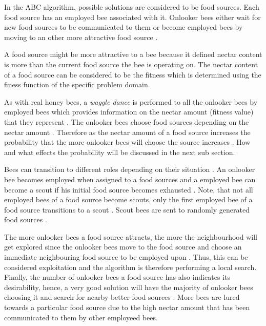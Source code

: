 In the ABC algorithm, possible solutions are considered to be food sources\cite{ABCCompareStudy,ABCNumericalOptimization}. Each food source has an employed bee associated with it. Onlooker bees either wait for new food sources to be communicated to them or become employed bees by moving to an other more attractive food source \cite{ABCCompareStudy,ABCNumericalOptimization}. 

A food source might be more attractive to a bee because it defined nectar content is more than the current food source the bee is operating on\cite{ABCCompareStudy,ABCNumericalOptimization}. The nectar content of a food source can be considered to be the fitness which is determined using the finess function of the specific problem domain\cite{ABCCompareStudy,ABCNumericalOptimization}.

As with real honey bees, a \emph{waggle dance} is performed to all the onlooker bees by employed bees which provides information on the nectar amount (fitness value) that they represent \cite{ABCReconfigDistro,ABCCompareStudy,ABCImageEnhancement}. The onlooker bees choose food sources depending on the nectar amount \cite{ABCReconfigDistro,ABCCompareStudy,ABCImageEnhancement}. Therefore as the nectar amount of a food source increases the probability that the more onlooker bees will choose the source increases \cite{ABCReconfigDistro,ABCCompareStudy,ABCImageEnhancement}. How and what effects the probability will be discussed in the next sub section.

Bees can transition to different roles depending on their situation \cite{ABCCompareStudy,ABCNumericalOptimization}. An onlooker bee becomes employed when assigned to a food sources and a employed bee can become a scout if his initial food source becomes exhausted \cite{ABCImageEnhancement,ABCCompareStudy,ABCReconfigDistro}. Note, that not all employed bees of a food source become scouts, only the first employed bee of a food source transitions to a scout \cite{ABCImageEnhancement,ABCCompareStudy,ABCReconfigDistro}. Scout bees are sent to randomly generated food sources \cite{ABCImageEnhancement,ABCCompareStudy,ABCReconfigDistro}. 

The more onlooker bees a food source attracts, the more the neighbourhood will get explored since the onlooker bees move to the food source and choose an immediate neighbouring food source to be employed upon \cite{ABCCompareStudy,ABCNumericalOptimization}. Thus, this can be considered exploitation and the algorithm is therefore performing a local search\cite{ABCCompareStudy,ABCReconfigDistro,ABCNumericalOptimization}. Finally, the number of onlooker bees a food source has also indicates its desirability, hence, a very good solution will have the majority of onlooker bees choosing it and search for nearby better food sources \cite{ABCCompareStudy,ABCReconfigDistro,ABCNumericalOptimization}. More bees are lured towards a particular food source due to the high nectar amount that has been communicated to them by other employeed bees\cite{ABCCompareStudy,ABCReconfigDistro,ABCNumericalOptimization}.

